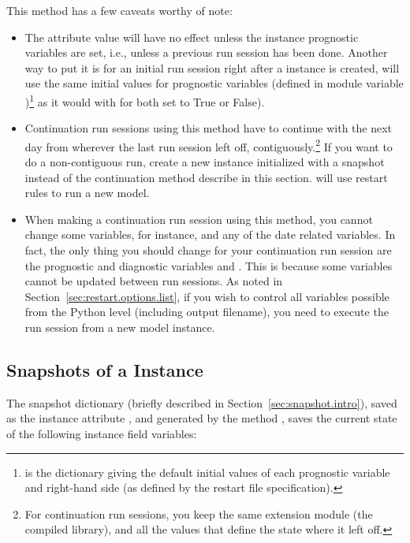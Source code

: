 This method has a few caveats worthy of note:
\begin{itemize}
\item The  attribute value
	will have no effect unless the instance prognostic variables
	are set, i.e., unless a previous run session has been done.
	Another way to put it is for an initial run session right
	after a  instance is created, 
	will use the same initial values for prognostic variables
	(defined in  module variable
	)\footnote%
		{ is the dictionary giving
		the default initial values of each prognostic variable
		and right-hand side (as defined by the restart file 
		specification).}
	as it would with for both
	 set to True or False).

\item Continuation run sessions using this method have to continue
	with the next day from wherever the last run session left
	off, contiguously.\footnote%
		{For continuation run sessions, you keep the 
		same extension module (the compiled  library),
		and all the values that define the state where it
		left off.}
	If you want to do a non-contiguous run,
	create a new  instance initialized with a
	snapshot instead of the continuation method describe in
	this section.
	will use restart rules to run a new model.  

\item When making a continuation run session using this method,
	you cannot change some variables, for instance,
	 and any of the date related
	variables.  In fact, the only thing you should change for
	your continuation run session are the prognostic and
	diagnostic variables and .  This is because
	some variables cannot be updated between run sessions.
	As noted in Section~\ref{sec:restart.options.list},
	if you wish to control all variables possible
	from the Python level (including output filename), you need 
	to execute the run session from a new model instance.
\end{itemize}


	\subsection{Snapshots of a  Instance}
				\label{sec:snapshots}

The snapshot dictionary (briefly described in
Section~\ref{sec:snapshot.intro}), saved as the  instance
attribute , and generated by the method
, saves the current state of the following
instance field variables:

